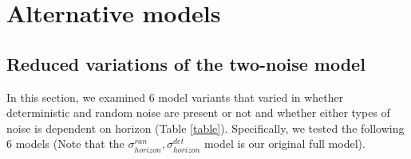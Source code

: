 \documentclass[12pt]{article}
\newcommand{\bcaption}[2]{\caption[#1]{\textbf{#1} #2}}
\renewcommand{\includegraphics}[2][]{}
\renewcommand{\caption}[1]{}
\begin{document}
%
	
	\newpage
	\section{Alternative models}
	\subsection{Reduced variations of the two-noise model}	
	In this section, we examined 6 model variants that varied in whether deterministic and random noise are present or not and whether either types of noise is dependent on horizon (Table \ref{table}). Specifically, we tested the following 6 models (Note that the $\sigma^{ran}_{horizon},\sigma^{det}_{horizon}$ model is our original full model).
	
\end{document}
